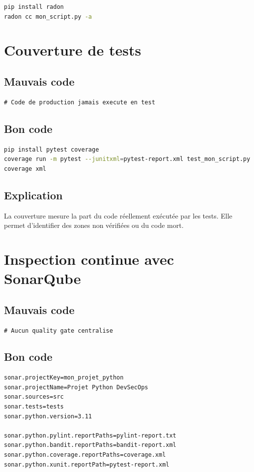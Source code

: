 \documentclass[a4paper,11pt]{report}
\begin{document}
\begin{lstlisting}[language=bash]
pip install radon
radon cc mon_script.py -a
\end{lstlisting}

\chapter{Couverture de tests}

\section{Mauvais code}
\begin{lstlisting}
# Code de production jamais execute en test
\end{lstlisting}

\section{Bon code}
\begin{lstlisting}[language=bash]
pip install pytest coverage
coverage run -m pytest --junitxml=pytest-report.xml test_mon_script.py
coverage xml
\end{lstlisting}

\section{Explication}
La couverture mesure la part du code réellement exécutée par les tests.
Elle permet d'identifier des zones non vérifiées ou du code mort.

\chapter{Inspection continue avec SonarQube}

\section{Mauvais code}
\begin{lstlisting}
# Aucun quality gate centralise
\end{lstlisting}

\section{Bon code}
\begin{lstlisting}[language=properties]
sonar.projectKey=mon_projet_python
sonar.projectName=Projet Python DevSecOps
sonar.sources=src
sonar.tests=tests
sonar.python.version=3.11

sonar.python.pylint.reportPaths=pylint-report.txt
sonar.python.bandit.reportPaths=bandit-report.xml
sonar.python.coverage.reportPaths=coverage.xml
sonar.python.xunit.reportPath=pytest-report.xml
\end{lstlisting}
\end{document}
